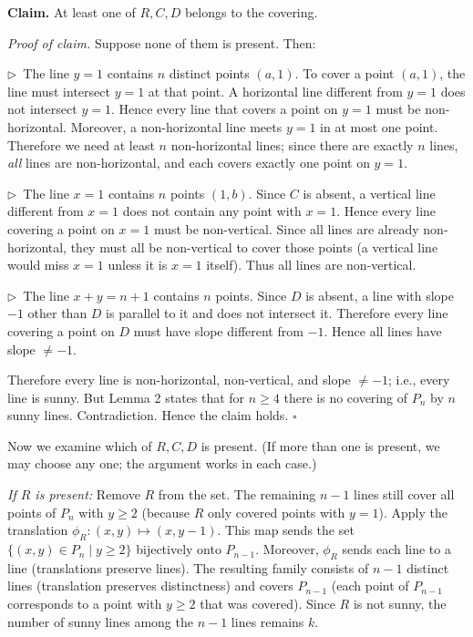 \documentclass{llmxive}
\providecommand{\compactbullet}[1]{\par\noindent$\triangleright$~#1\par}
\begin{document}
\textbf{Claim.} At least one of \(R, C, D\) belongs to the covering.\par
\emph{Proof of claim.} Suppose none of them is present. Then:\par
\compactbullet{The line \(y=1\) contains \(n\) distinct points \((a,1)\). To cover a point \((a,1)\), the line must intersect \(y=1\) at that point. A horizontal line different from \(y=1\) does not intersect \(y=1\). Hence every line that covers a point on \(y=1\) must be non-horizontal. Moreover, a non-horizontal line meets \(y=1\) in at most one point. Therefore we need at least \(n\) non-horizontal lines; since there are exactly \(n\) lines, \emph{all} lines are non-horizontal, and each covers exactly one point on \(y=1\).}
\compactbullet{The line \(x=1\) contains \(n\) points \((1,b)\). Since \(C\) is absent, a vertical line different from \(x=1\) does not contain any point with \(x=1\). Hence every line covering a point on \(x=1\) must be non-vertical. Since all lines are already non-horizontal, they must all be non-vertical to cover those points (a vertical line would miss \(x=1\) unless it is \(x=1\) itself). Thus all lines are non-vertical.}
\compactbullet{The line \(x+y=n+1\) contains \(n\) points. Since \(D\) is absent, a line with slope \(-1\) other than \(D\) is parallel to it and does not intersect it. Therefore every line covering a point on \(D\) must have slope different from \(-1\). Hence all lines have slope \(\neq -1\).}
Therefore every line is non-horizontal, non-vertical, and slope \(\neq -1\); i.e., every line is sunny. But Lemma 2 states that for \(n\ge 4\) there is no covering of \(P_n\) by \(n\) sunny lines. Contradiction. Hence the claim holds. \(\square\)\par
Now we examine which of \(R, C, D\) is present. (If more than one is present, we may choose any one; the argument works in each case.)\par
\emph{If \(R\) is present:} Remove \(R\) from the set. The remaining \(n-1\) lines still cover all points of \(P_n\) with \(y\ge 2\) (because \(R\) only covered points with \(y=1\)). Apply the translation \(\phi_R: (x,y) \mapsto (x, y-1)\). This map sends the set \(\{(x,y)\in P_n \mid y\ge 2\}\) bijectively onto \(P_{n-1}\). Moreover, \(\phi_R\) sends each line to a line (translations preserve lines). The resulting family consists of \(n-1\) distinct lines (translation preserves distinctness) and covers \(P_{n-1}\) (each point of \(P_{n-1}\) corresponds to a point with \(y\ge 2\) that was covered). Since \(R\) is not sunny, the number of sunny lines among the \(n-1\) lines remains \(k\).\par
\end{document}
